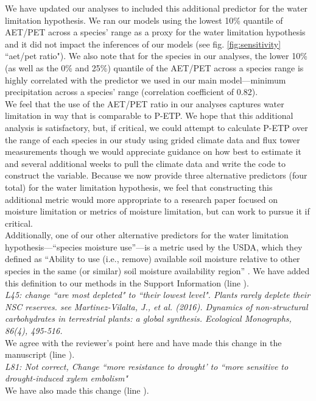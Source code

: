 \documentclass{article}[11pt]
\begin{document}
We have updated our analyses to included this additional predictor for the water limitation hypothesis. We ran our models using the lowest 10\% quantile of AET/PET across a species' range as a proxy for the water limitation hypothesis and it did not impact the inferences of our models (see fig. \ref{fig:sensitivity} ``aet/pet ratio"). We also note that for the species in our analyses, the lower 10\% (as well as the 0\% and 25\%) quantile of the AET/PET across a species range is highly correlated with the predictor we used in our main model---minimum precipitation across a species' range (correlation coefficient of 0.82).\\ %

We feel that the use of the AET/PET ratio in our analyses captures water limitation in way that is comparable to P-ETP. We hope that this additional analysis is satisfactory, but, if critical, we could attempt to calculate P-ETP over the range of each species in our study using grided climate data and flux tower measurements though we would appreciate guidance on how best to estimate it and several additional weeks to pull the climate data and write the code to construct the variable. Because we now provide three alternative predictors  (four total) for the water limitation hypothesis, we feel that constructing this additional metric would  more appropriate to a research paper focused on moisture limitation or metrics of moisture limitation, but can work to pursue it if critical.\\

Additionally, one of our other alternative predictors for the water limitation hypothesis---``species moisture use''---is a metric used by the USDA, which they defined as ``Ability to use (i.e., remove) available soil moisture relative to other species in the same (or similar) soil moisture availability region'' \citep{usdancrs}. We have added this definition to our methods in the Support Information (line ).\\ %

\textit{L45: change ``are most depleted" to ``their lowest level". Plants rarely deplete their NSC reserves. see Martinez-Vilalta, J., et al. (2016). Dynamics of non-structural carbohydrates in terrestrial plants: a global synthesis. Ecological Monographs, 86(4), 495-516.}\\

We agree with the reviewer's point here and have made this change in the manuscript (line ).\\


\textit{L81: Not correct, Change ``more resistance to drought' to ``more sensitive to drought-induced xylem embolism"}\\

We have also made this change (line ).


\end{document}
